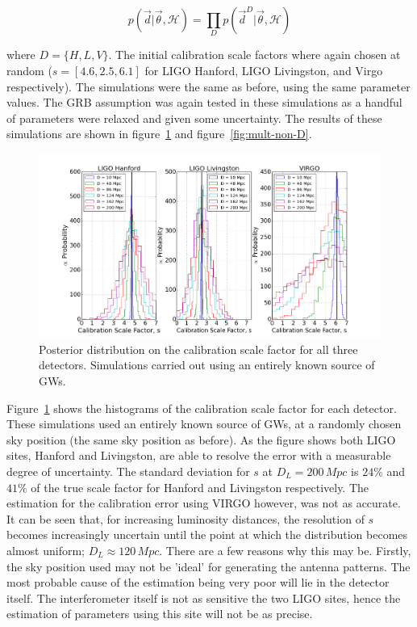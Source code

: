 \documentclass[12pt]{iopart}
\newcommand{\curlH}{\mathcal{H}}
\begin{document}
\begin{equation}
  \label{eq:mult-likeli}
  p(\vec{d}| \vec{\theta}, \curlH) = \prod \limits_D p(\vec{d}^D| \vec{\theta},
\curlH)
\end{equation}

where $D = \{H,L,V\}$. The initial calibration scale factors where again chosen
at random ($s = [4.6, 2.5, 6.1]$ for LIGO Hanford, LIGO Livingston, and Virgo
respectively). The simulations were the same as before, using the same
parameter values. The GRB assumption was again tested in these simulations as a
handful of parameters were relaxed and given some uncertainty. The results of
these simulations are shown in figure~\ref{fig:mult-empty-D} and
figure~\ref{fig:mult-non-D}.

\begin{figure}
  \centering
  \includegraphics[width = \textwidth]{MD_empty_D10_200}
  \caption{Posterior distribution on the calibration scale factor for
all three detectors. Simulations carried out using an entirely known source of
GWs.}
    \label{fig:mult-empty-D}
\end{figure}

Figure~\ref{fig:mult-empty-D} shows the histograms of the calibration scale
factor for each detector. These simulations used an entirely known source of
GWs, at a randomly chosen sky position (the same sky position as before). As
the figure shows both LIGO sites, Hanford and Livingston, are able to resolve
the error with a measurable degree of uncertainty. The standard deviation for
$s$ at $D_{L}=200\,Mpc$ is $24\%$ and $41\%$ of the true scale factor for
Hanford and Livingston respectively. The estimation for the calibration error
using VIRGO however, was not as accurate. It can be seen that, for increasing
luminosity distances, the resolution of $s$ becomes increasingly uncertain
until the point at which the distribution becomes almost uniform; $D_{L}
\approx 120\,Mpc$. There are a few reasons why this may be. Firstly, the sky
position used may not be 'ideal' for generating the antenna patterns. The most
probable cause of the estimation being very poor will lie in the detector
itself. The interferometer itself is not as sensitive the two LIGO sites, hence
the estimation of parameters using this site will not be as precise.
\end{document}

